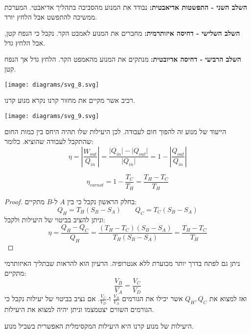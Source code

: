 \documentclass{tstextbook}
\begin{document}
\textbf{השלב השני - התפשטות אדיאבטית:}
נבודד את המנוע מהסביבה בתהליך אדיאבטי. המערכת ממשיכה להתפשט אבל הלחץ יורד.

\textbf{השלב השלישי - דחיסה איזותרמית:}
מחברים את המנוע לאמבט הקר. נקבל כי הנפח קטן, אבל הלחץ גדל.

\textbf{השלב הרביעי - דחיסה אדיובטית:}
מנתקים את המנוע מהאמפט הקר. הלחץ גדל אך הנפח קטן.

\texttt{[image: diagrams/svg\_8.svg]}
\begin{definition}
רכיב אשר מקיים את מחזור קרנו נקרא מנוע קרנו.

\end{definition}
\texttt{[image: diagrams/svg\_9.svg]}
\begin{definition}[יעילות]
הייעוד של מנוע זה להפוך חום לעבודה. לכן היעילות שלו תהיה היחס בין כמות החום שהתקבל לעבודה שהוציא. כלומר:
$$\eta = \left\lvert  \frac{W_{out}}{Q_{in}}  \right\rvert = \frac{\lvert Q_{in} \rvert -\lvert Q_{out} \rvert}{\lvert Q_{in} \rvert }=1-\left\lvert  \frac{Q_{out}}{Q_{in}}  \right\rvert  $$

\end{definition}
\begin{proposition}
$$\eta_{carnot}=1-\frac{T_{C}}{T_{H}}=\frac{T_{H}-T_{C}}{T_{H}}$$

\end{proposition}
\begin{proof}
בחלק הראשון נקבל כי בין \(A\) ל-\(B\) מתקיים:
$$Q_{H}=T_{H}(S_{B}-S_{A}) \qquad Q_{C}=T_{C}(S_{B}-S_{A})$$
וניתן להציב בביטוי של היעילות ולקבל:
$$\eta = \frac{Q_{H} - Q_{C}}{Q_{H}}= \frac{(T_{H}-T_{C})(S_{B}-S_{A})}{T_{H}(S_{B}-S_{A})}=\frac{T_{H}-T_{C}}{T_{H}}$$

\end{proof}
\begin{remark}
ניתן גם לפתח בדרך יותר מכוערת ללא אנטרופיה. הרעיון הוא להראות שבתליך האיזותרמי מתקיים:
$$\frac{V_{B}}{V_{A}}=\frac{V_{C}}{V_{D}}$$
ואז למצוא את \(Q_{H},Q_{C}\) אשר יכילו את הגורמים \(\frac{V_{B}}{V_{A}}\) ו-\(\frac{V_{C}}{V_{D}}\). אם נציב בביטוי של יעילות נקבל כי הגורמים השווים יצטמצמו וניתן יהיה למצוא את היעילות.

\end{remark}
\begin{theorem}
היעילות של מנוע קרנו היא היעילות המקסימלית האפשרית בשביל מנוע.

\end{theorem}
\end{document}
